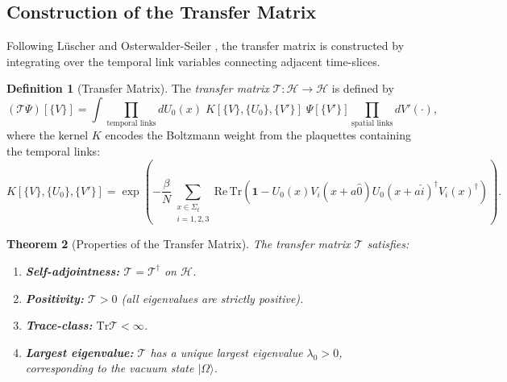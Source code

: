 \documentclass[12pt, a4paper]{article}
\theoremstyle{plain}
\newtheorem{theorem}{Theorem}[section]
\theoremstyle{definition}
\newtheorem{definition}[theorem]{Definition}
\theoremstyle{remark}
\newcommand{\Tr}{\mathrm{Tr}}
\newcommand{\calH}{\mathcal{H}}
\newcommand{\calT}{\mathcal{T}}
\begin{document}
\subsection{Construction of the Transfer Matrix}

Following L\"uscher \citep{Luscher1977} and Osterwalder-Seiler
\citep{OsterwalderSeiler1978}, the transfer matrix is constructed by
integrating over the temporal link variables connecting adjacent time-slices.

\begin{definition}[Transfer Matrix]\label{def:transfer}
  The \emph{transfer matrix} $\calT: \calH \to \calH$ is defined by
  \begin{equation}\label{eq:transfer}
    (\calT \Psi)[\{V\}] = \int \prod_{\text{temporal links}} dU_0(x)
    \; K[\{V\}, \{U_0\}, \{V'\}] \; \Psi[\{V'\}]
    \prod_{\text{spatial links}} dV'(\cdot),
  \end{equation}
  where the kernel $K$ encodes the Boltzmann weight from the plaquettes
  containing the temporal links:
  \begin{equation}
    K[\{V\}, \{U_0\}, \{V'\}] = \exp\!\left(
    -\frac{\beta}{N} \sum_{\substack{x \in \Sigma_t \\ i=1,2,3}}
    \mathrm{Re}\,\Tr\!\left(
    \mathbf{1} - U_0(x) V_i(x+a\hat{0}) U_0(x+a\hat{i})^\dagger V_i(x)^\dagger
    \right)\right).
  \end{equation}
\end{definition}

\begin{theorem}[Properties of the Transfer Matrix]\label{thm:transfer}
  The transfer matrix $\calT$ satisfies:
  \begin{enumerate}[label=(\alph*)]
    \item \textbf{Self-adjointness:} $\calT = \calT^\dagger$ on $\calH$.
    \item \textbf{Positivity:} $\calT > 0$ (all eigenvalues are strictly positive).
    \item \textbf{Trace-class:} $\Tr \calT < \infty$.
    \item \textbf{Largest eigenvalue:} $\calT$ has a unique largest eigenvalue
      $\lambda_0 > 0$, corresponding to the vacuum state $|\Omega\rangle$.
  \end{enumerate}
\end{theorem}
\end{document}
